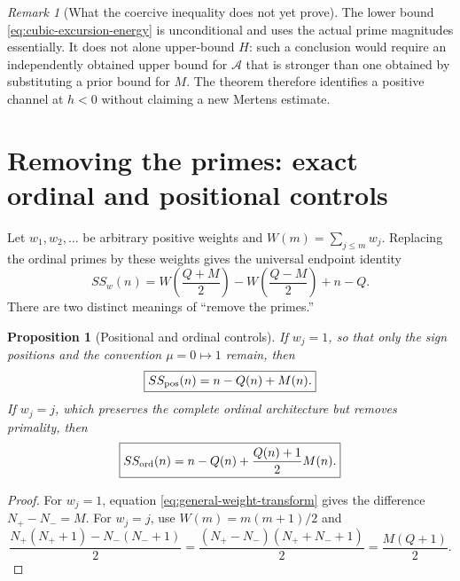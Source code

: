 \documentclass[11pt]{amsart}
\numberwithin{equation}{section}
\theoremstyle{plain}
\newtheorem{proposition}[theorem]{Proposition}
\theoremstyle{definition}
\theoremstyle{remark}
\newtheorem{remark}[theorem]{Remark}
\begin{document}
\begin{remark}[What the coercive inequality does not yet prove]
The lower bound \eqref{eq:cubic-excursion-energy} is unconditional and uses
the actual prime magnitudes essentially.  It does not alone upper-bound $H$:
such a conclusion would require an independently obtained upper bound for
$\mathcal A$ that is stronger than one obtained by substituting a prior bound
for $M$.  The theorem therefore identifies a positive channel at $h<0$ without
claiming a new Mertens estimate.
\end{remark}

\section{Removing the primes: exact ordinal and positional controls}
\label{sec:remove-primes}

Let $w_1,w_2,\ldots$ be arbitrary positive weights and
$W(m)=\sum_{j\le m}w_j$.  Replacing the ordinal primes by these weights gives
the universal endpoint identity
\begin{equation}
\label{eq:general-weight-transform}
SS_w(n)=W\!\left(\frac{Q+M}{2}\right)
-W\!\left(\frac{Q-M}{2}\right)+n-Q.
\end{equation}
There are two distinct meanings of ``remove the primes.''

\begin{proposition}[Positional and ordinal controls]
\label{prop:nonprime-controls}
If $w_j=1$, so that only the sign positions and the convention $\mu=0\mapsto1$
remain, then
\begin{equation}
\label{eq:ss-positional}
\boxed{SS_{\rm pos}(n)=n-Q(n)+M(n).}
\end{equation}
If $w_j=j$, which preserves the complete ordinal architecture but removes
primality, then
\begin{equation}
\label{eq:ss-ordinal}
\boxed{SS_{\rm ord}(n)=n-Q(n)+\frac{Q(n)+1}{2}M(n).}
\end{equation}
\end{proposition}

\begin{proof}
For $w_j=1$, equation \eqref{eq:general-weight-transform} gives the difference
$N_+-N_-=M$.  For $w_j=j$, use $W(m)=m(m+1)/2$ and
\begin{equation*}
\frac{N_+(N_++1)-N_-(N_-+1)}2
=\frac{(N_+-N_-)(N_++N_-+1)}2
=\frac{M(Q+1)}2.
\end{equation*}
\end{proof}
\end{document}
